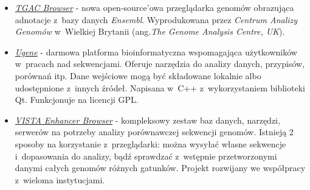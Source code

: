 \begin{itemize}
	\item \href{http://tgac-browser.tgac.ac.uk/}{\emph{TGAC Browser}} - nowa open-source'owa przeglądarka genomów obrazująca adnotacje z~bazy danych \emph{Ensembl}. Wyprodukowana przez \emph{Centrum Analizy Genomów} w~Wielkiej Brytanii (ang.\emph{The Genome Analysis Centre, UK}).
	
	\item \href{http://ugene.net/}{\emph{Ugene}} - darmowa platforma bioinformatyczna wspomagająca użytkowników w~pracach nad sekwencjami. Oferuje narzędzia do analizy danych, przypisów, porównań itp. Dane wejściowe mogą być składowane lokalnie albo udostępnione z~innych źródeł. Napisana w~C++ z~wykorzystaniem biblioteki Qt. Funkcjonuje na licencji GPL.
	
	\item \href{http://enhancer.lbl.gov/}{\emph{VISTA Enhancer Browser}} - kompleksowy zestaw baz danych, narzędzi, serwerów na potrzeby analizy porównawczej sekwencji genomów. Istnieją 2 sposoby na korzystanie z~przeglądarki: można wysyłać własne sekwencje i~dopasowania do analizy, bądź sprawdzać z~wstępnie przetworzonymi danymi całych genomów różnych gatunków. Projekt rozwijany we współpracy z~wieloma instytucjami.
	
	
\end{itemize}